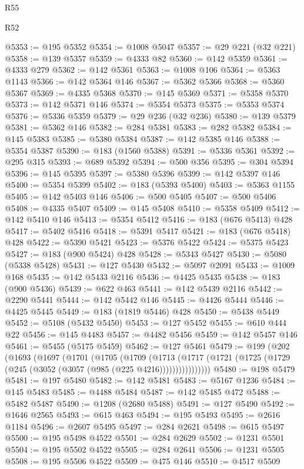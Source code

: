 \begin{lexlean}{R55}
\begin{lexlean}{R52}
\begin{coremodule}
{{{{{{{{{{{{{{{{{{{{{{{{{{{{{{{{{{{{{{{{{{{{{{{{{{{{{{{{{{{{{{{{{{{{{{{{{{{{{{{{{{{{{{{{{{{{{{{{{{{{{{{{{{{{{{{{{{{{{{{{{{{{{{{{{{{{{{{{{{{{{{{{{{{{{{{{{{{{{{{{{{{{{{{{{{{{{{{{{{{{{{{{{{{{{{{{{{{{{{@5353 := @195 @5352
@5354 := @1008 @5047
@5357 := @29 @221 (@32 @221)
@5358 := @139 @5357
@5359 := @4333 @82
@5360 := @142 @5359
@5361 := @4333 @279
@5362 := @142 @5361
@5363 := @1008 @106
@5364 := @5363 @1143
@5366 := @142 @5364 @146
@5367 := @5362 @5366
@5368 := @5360 @5367
@5369 := @4335 @5368
@5370 := @145 @5369
@5371 := @5358 @5370
@5373 := @142 @5371 @146
@5374 := @5354 @5373
@5375 := @5353 @5374
@5376 := @5336 @5359
@5379 := @29 @236 (@32 @236)
@5380 := @139 @5379
@5381 := @5362 @146
@5382 := @284 @5381
@5383 := @282 @5382
@5384 := @145 @5383
@5385 := @5380 @5384
@5387 := @142 @5385 @146
@5388 := @5354 @5387
@5390 := @183 (@1560 @5388)
@5391 := @5336 @5361
@5392 := @295 @315
@5393 := @689 @5392
@5394 := @500 @356
@5395 := @304 @5394
@5396 := @145 @5395
@5397 := @5380 @5396
@5399 := @142 @5397 @146
@5400 := @5354 @5399
@5402 := @183 (@5393 @5400)
@5403 := @5363 @1155
@5405 := @142 @5403 @146
@5406 := @500 @5405
@5407 := @500 @5406
@5408 := @4335 @5407
@5409 := @145 @5408
@5410 := @5358 @5409
@5412 := @142 @5410 @146
@5413 := @5354 @5412
@5416 := @183 (@676 @5413) @428
@5417 := @5402 @5416
@5418 := @5391 @5417
@5421 := @183 (@676 @5418) @428
@5422 := @5390 @5421
@5423 := @5376 @5422
@5424 := @5375 @5423
@5427 := @183 (@900 @5424) @428
@5428 := @5343 @5427
@5430 := @5080 (@5338 @5428)
@5431 := @127 @5430
@5432 := @5097 @2091
@5433 := @1009 @168
@5435 := @142 @5433 @2116
@5436 := @4425 @5435
@5438 := @183 (@900 @5436)
@5439 := @622 @463
@5441 := @142 @5439 @2116
@5442 := @2290 @5441
@5444 := @142 @5442 @146
@5445 := @4426 @5444
@5446 := @4425 @5445
@5449 := @183 (@1819 @5446) @428
@5450 := @5438 @5449
@5452 := @5108 (@5432 @5450)
@5453 := @127 @5452
@5455 := @610 @444 @22
@5456 := @145 @4483
@5457 := @4482 @5456
@5459 := @142 @5457 @146
@5461 := @5455 (@5175 @5459)
@5462 := @127 @5461
@5479 := @199
    (@202
      (@1693
        (@1697
          (@1701
            (@1705
              (@1709
                (@1713
                  (@1717 (@1721 (@1725 (@1729 (@245 (@3052 (@3057 (@985 (@225 @4216))))))))))))))))
@5480 := @198 @5479
@5481 := @197 @5480
@5482 := @142 @5481
@5483 := @5167 @1236
@5484 := @145 @5483
@5485 := @4488 @5484
@5487 := @142 @5485 @472
@5488 := @5482 @5487
@5490 := @1208 (@2680 @5488)
@5491 := @127 @5490
@5492 := @1646 @2565
@5493 := @615 @463
@5494 := @195 @5493
@5495 := @2616 @1184
@5496 := @2607 @5495
@5497 := @284 @2621
@5498 := @615 @5497
@5500 := @195 @5498 @4522
@5501 := @284 @2629
@5502 := @1231 @5501
@5504 := @195 @5502 @4522
@5505 := @284 @2641
@5506 := @1231 @5505
@5508 := @195 @5506 @4522
@5509 := @475 @146
@5510 := @4517 @5509
}}}}}}}}}}}}}}}}}}}}}}}}}}}}}}}}}}}}}}}}}}}}}}}}}}}}}}}}}}}}}}}}}}}}}}}}}}}}}}}}}}}}}}}}}}}}}}}}}}}}}}}}}}}}}}}}}}}}}}}}}}}}}}}}}}}}}}}}}}}}}}}}}}}}}}}}}}}}}}}}}}}}}}}}}}}}}}}}}}}}}}}}}}}}}}}}}}}}}}
\end{coremodule}
\end{lexlean}
\end{lexlean}
